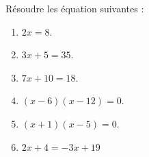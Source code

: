 
\begin{exercice}\label{exosmath-0642}

    Résoudre les équation suivantes :
    \begin{multicols}{2}
    \begin{enumerate}
        \item
            \( 2x=8\).
        \item
            \( 3x+5=35\).
        \item
            \( 7x+10=18\).
        \item
            \( (x-6)(x-12)=0\).
        \item
            \( (x+1)(x-5)=0\).
        \item
            \( 2x+4=-3x+19\)
    \end{enumerate}
    \end{multicols}

\end{exercice}

